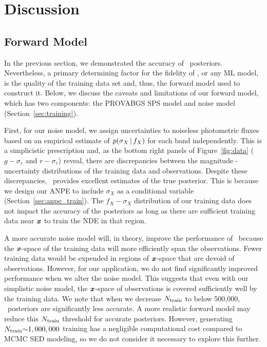 \section{Discussion} \label{sec:discuss}
\subsection{Forward Model} \label{sec:forward-model}
In the previous section, we demonstrated the accuracy of \sedflow~posteriors. 
Nevertheless, a primary determining factor for the fidelity of \sedflow, or any
ML model, is the quality of the training data set and, thus, the forward model
used to construct it. 
Below, we discuss the caveats and limitations of our forward model, which has
two components: the PROVABGS SPS model and noise model 
(Section~\ref{sec:training}).

First, for our noise model, we assign uncertainties to noiseless photometric
fluxes based on an empirical estimate of $p(\sigma_X\,|\, f_X)$ for each band
independently. 
This is a simplicistic prescription and, as the bottom right panels of
Figure~\ref{fig:data} ($g - \sigma_r$ and $r - \sigma_r$) reveal, there are
discrepancies between the magnitude - uncertainty distributions of the training
data and observations. 
Despite these discrepancies, \sedflow~provides excellent estimates of the true
posterior.  
This is because we design our ANPE to include $\sigma_X$ as a conditional
variable (Section~\ref{sec:anpe_train}).
The $f_X-\sigma_X$ distribution of our training data does not impact the
accuracy of the posteriors as long as there are sufficient training data near
$\textbf{\textit{x}}$ to train the NDE in that region.

A more accurate noise model will, in theory, improve the performance of
\sedflow~because the $\textbf{\textit{x}}$-space of the training data will more efficiently 
span the observations. 
Fewer training data would be expended in regions of $\textbf{\textit{x}}$-space that are
devoid of observations.  
However, for our application, we do not find significantly  
improved performance when we alter the noise model.
This suggests that even with our simplistic noise model, the $\textbf{\textit{x}}$-space of
observations is covered sufficiently well by the training data. 
We note that when we decrease $N_{\rm train}$ to below 500,000,
\sedflow~posteriors are significantly less accurate. 
A more realistic forward model may reduce this $N_{\rm train}$ threshold for
accurate posteriors. 
However, generating $N_{\rm train}{\sim}1,000,000$ training has a negligible
computational cost compared to MCMC SED modeling, so we do not consider it
necessary to explore this further. 

